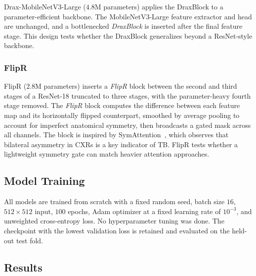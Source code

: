 \documentclass[conference, letterpaper]{IEEEtran}
\begin{document}
Drax-MobileNetV3-Large ($4.8$M parameters) applies the DraxBlock to a parameter-efficient backbone. The MobileNetV3-Large feature extractor and head are unchanged, and a bottlenecked \emph{DraxBlock} is inserted after the final feature stage. This design tests whether the DraxBlock generalizes beyond a ResNet-style backbone.

\subsubsection{FlipR}

FlipR ($2.8$M parameters) inserts a \emph{FlipR} block between the second and third stages of a ResNet-18 truncated to three stages, with the parameter-heavy fourth stage removed. The \emph{FlipR} block computes the difference between each feature map and its horizontally flipped counterpart, smoothed by average pooling to account for imperfect anatomical symmetry, then broadcasts a gated mask across all channels. The block is inspired by SymAttention~\cite{liu2023tbx11k_pami}, which observes that bilateral asymmetry in CXRs is a key indicator of TB. FlipR tests whether a lightweight symmetry gate can match heavier attention approaches.

\subsection{Model Training}

All models are trained from scratch with a fixed random seed, batch size $16$, $512\times512$ input, $100$ epochs, Adam optimizer at a fixed learning rate of $10^{-3}$, and unweighted cross-entropy loss. No hyperparameter tuning was done. The checkpoint with the lowest validation loss is retained and evaluated on the held-out test fold.

\subsection{Results}
\end{document}

